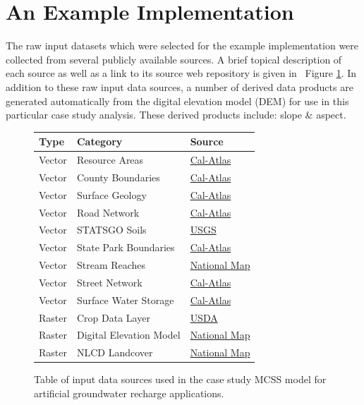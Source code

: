 \section{An Example Implementation}
    
The raw input datasets which were selected for the example implementation were collected from several publicly available sources. A brief topical description of each source as well as a link to its source web repository is given in ~Figure \ref{fig:DataSources}. In addition to these raw input data sources, a number of derived data products are generated automatically from the digital elevation model (DEM) for use in this particular case study analysis. These derived products include: slope \& aspect.

    \begin{figure}[!h]
        \begin{center}
            \begin{tabular*}{0.45\textwidth}{l | l | l}
                \textbf{Type} & \textbf{Category} & \textbf{Source} \\ \hline
                Vector & Resource Areas & \href{http://www.atlas.ca.gov/download.html}{Cal-Atlas} \\ \hline
                Vector & County Boundaries & \href{http://www.atlas.ca.gov/download.html}{Cal-Atlas} \\ \hline
                Vector & Surface Geology & \href{http://www.atlas.ca.gov/download.html}{Cal-Atlas} \\ \hline
                Vector & Road Network & \href{http://www.atlas.ca.gov/download.html}{Cal-Atlas} \\ \hline
                Vector & STATSGO Soils & \href{http://water.usgs.gov/GIS/metadata/usgswrd/XML/ussoils.xml#stdorder}{USGS} \\ \hline
                Vector & State Park Boundaries & \href{http://www.atlas.ca.gov/download.html}{Cal-Atlas} \\ \hline
                Vector & Stream Reaches & \href{http://viewer.nationalmap.gov/viewer/}{National Map} \\ \hline
                Vector & Street Network & \href{http://www.atlas.ca.gov/download.html}{Cal-Atlas} \\ \hline
                Vector & Surface Water Storage & \href{http://www.atlas.ca.gov/download.html}{Cal-Atlas} \\ \hline
                Raster & Crop Data Layer & \href{http://www.nass.usda.gov/research/Cropland/SARS1a.htm}{USDA} \\ \hline
                Raster & Digital Elevation Model & \href{http://viewer.nationalmap.gov/viewer/}{National Map} \\ \hline
                Raster & NLCD Landcover & \href{http://viewer.nationalmap.gov/viewer/}{National Map} \\ 
           \end{tabular*}
    \end{center}
    \caption{Table of input data sources used in the case study MCSS model for artificial groundwater recharge applications.}
    \label{fig:DataSources}
    \end{figure}

